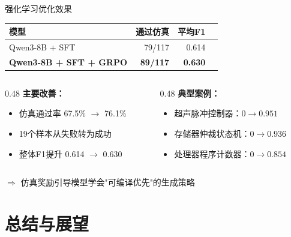 \documentclass[aspectratio=169,10pt]{beamer}
\begin{document}
\begin{frame}{强化学习优化效果}
\centering
\begin{tabular}{lrrr}
  \toprule
  模型 & 通过仿真 & 平均F1 \\
  \midrule
  Qwen3-8B + SFT & 79/117 & 0.614 \\
  \textbf{Qwen3-8B + SFT + GRPO} & \textbf{89/117} & \textbf{0.630} \\
  \bottomrule
\end{tabular}

\vspace{1em}
\begin{columns}[T]
\begin{column}{0.48\textwidth}
\textbf{主要改善：}
\begin{itemize}
  \item 仿真通过率 67.5\% $\to$ 76.1\%
  \item 19个样本从失败转为成功
  \item 整体F1提升 0.614 $\to$ 0.630
\end{itemize}
\end{column}
\begin{column}{0.48\textwidth}
\textbf{典型案例：}
\begin{itemize}
  \item 超声脉冲控制器：$0\to0.951$
  \item 存储器仲裁状态机：$0\to0.936$
  \item 处理器程序计数器：$0\to0.854$
\end{itemize}
\end{column}
\end{columns}

\vspace{0.5em}
\centering
$\Rightarrow$ 仿真奖励引导模型学会"可编译优先"的生成策略
\end{frame}

\section{总结与展望}
\end{document}
